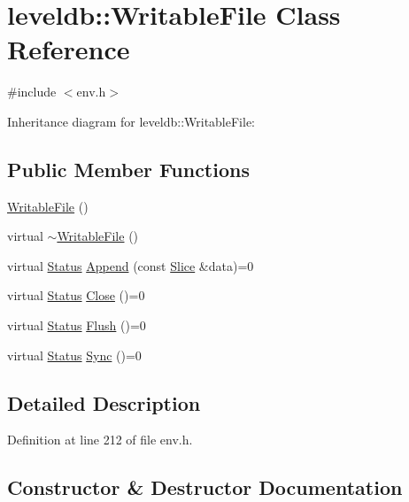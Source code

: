 \hypertarget{classleveldb_1_1_writable_file}{}\section{leveldb\+:\+:Writable\+File Class Reference}
\label{classleveldb_1_1_writable_file}


{\ttfamily \#include $<$env.\+h$>$}



Inheritance diagram for leveldb\+:\+:Writable\+File\+:
\subsection*{Public Member Functions}
\begin{DoxyCompactItemize}
\item 
\hyperlink{classleveldb_1_1_writable_file_a48e7bcecb75e0339f0dafedb41c058ee}{Writable\+File} ()
\item 
virtual \hyperlink{classleveldb_1_1_writable_file_a6a2f4698544f04288fbee6ef354dd71d}{$\sim$\+Writable\+File} ()
\item 
virtual \hyperlink{classleveldb_1_1_status}{Status} \hyperlink{classleveldb_1_1_writable_file_a53b41841d9577d28f65d4d90e1660de8}{Append} (const \hyperlink{classleveldb_1_1_slice}{Slice} \&data)=0
\item 
virtual \hyperlink{classleveldb_1_1_status}{Status} \hyperlink{classleveldb_1_1_writable_file_a2efbf9c02a26028b5002df73b4393915}{Close} ()=0
\item 
virtual \hyperlink{classleveldb_1_1_status}{Status} \hyperlink{classleveldb_1_1_writable_file_ab95759ad32f6a05b0ee4266969fa265e}{Flush} ()=0
\item 
virtual \hyperlink{classleveldb_1_1_status}{Status} \hyperlink{classleveldb_1_1_writable_file_a2d2dcef02a2c9e71f3d39125bcd5a606}{Sync} ()=0
\end{DoxyCompactItemize}


\subsection{Detailed Description}


Definition at line 212 of file env.\+h.



\subsection{Constructor \& Destructor Documentation}
\hypertarget{classleveldb_1_1_writable_file_a48e7bcecb75e0339f0dafedb41c058ee}{}
